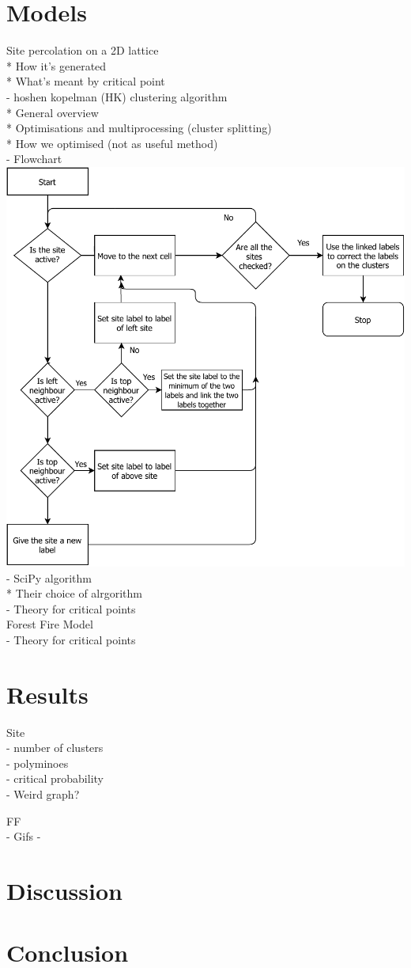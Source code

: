 \documentclass[%
 reprint,
 amsmath,amssymb,
 aps,
]{revtex4-2}
\begin{document}
\section{Models}
Site percolation on a 2D lattice\\
* How it's generated\\
* What's meant by critical point\\
- hoshen kopelman (HK) clustering algorithm\\
* General overview\\
* Optimisations and multiprocessing (cluster splitting)\\
* How we optimised (not as useful method)\\
- Flowchart\\
\includegraphics[width=\linewidth]{assets/hk_algroithm}
- SciPy algorithm\\
* Their choice of alrgorithm\\
- Theory for critical points\\

Forest Fire Model\\
- Theory for critical points\\

\section{Results}

Site\\
- number of clusters\\
- polyminoes\\
- critical probability\\
- Weird graph?

FF\\
- Gifs
- 

\section{Discussion}

\section{Conclusion}

\end{document}
